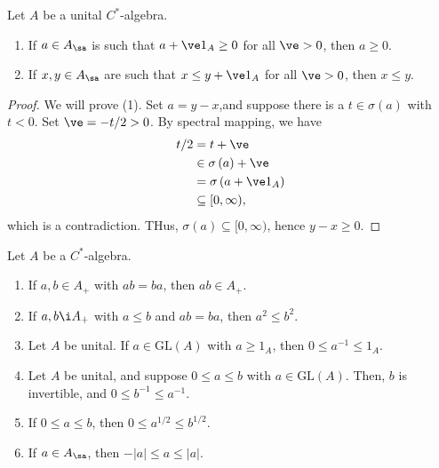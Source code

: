 \documentclass[10pt]{mypackage}
\newcommand{\GL}{\text{GL}}
\begin{document}
\begin{lemma}
  Let $A$ be a unital $C^{\ast}$-algebra.
  \begin{enumerate}[(1)]
    \item If $a\in A_{\sa}$ is such that $a + \ve 1_A \geq 0$ for all $\ve > 0$, then $a\geq 0$.
    \item If $x,y\in A_{\sa}$ are such that $x\leq y + \ve 1_A$ for all $\ve > 0$, then $x\leq y$.
  \end{enumerate}
\end{lemma}
\begin{proof}
  We will prove (1). Set $a = y-x$,and suppose there is a $t\in \sigma\left(a\right)$ with $t < 0$. Set $\ve = -t/2 > 0$. By spectral mapping, we have
  \begin{align*}
    t/2 &= t + \ve\\
        &\in \sigma\left(a\right) + \ve\\
        &= \sigma\left(a + \ve 1_A\right)\\
        &\subseteq [0,\infty),
  \end{align*}
  which is a contradiction. THus, $\sigma\left(a\right)\subseteq [0,\infty)$, hence $y-x \geq 0$.
\end{proof}
\begin{proposition}
  Let $A$ be a $C^{\ast}$-algebra.
  \begin{enumerate}[(1)]
    \item If $a,b\in A_{+}$ with $ab = ba$, then $ab\in A_+$.
    \item If $a,b\i A_+$ with $a \leq b$ and $ab = ba$, then $a^2 \leq b^2$.
    \item Let $A$ be unital. If $a\in \GL\left(A\right)$ with $a\geq 1_A$, then $0 \leq a^{-1}\leq 1_A$.
    \item Let $A$ be unital, and suppose $0\leq a \leq b$ with $a\in \GL\left(A\right)$. Then, $b$ is invertible, and $0\leq b^{-1}\leq a^{-1}$.
    \item If $0 \leq a \leq b$, then $0 \leq a^{1/2}\leq b^{1/2}$.
    \item If $a\in A_{\sa}$, then $-\left\vert a \right\vert\leq a \leq \left\vert a \right\vert$.
  \end{enumerate}
\end{proposition}
\end{document}
